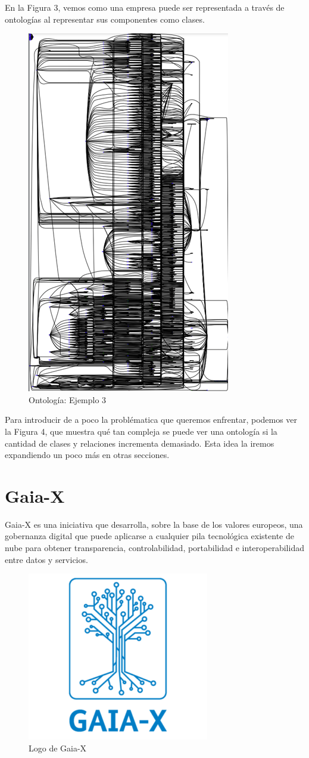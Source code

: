 En la Figura 3, vemos como una empresa puede ser representada a través de ontologías al representar sus componentes como clases.

\begin{figure}[ht]
   \begin{center}
      \includegraphics[width=0.4\linewidth]{introduction/figures/ontology_example_3.jpg}
   \end{center}
   \caption[Ontología: Ejemplo 3]
   {\footnotesize Ontología: Ejemplo 3}
   \label{fig:mufigure7}
\end{figure}

Para introducir de a poco la problématica que queremos enfrentar, podemos ver la Figura 4, que muestra qué tan compleja se puede ver una ontología si la cantidad de clases y relaciones incrementa demasiado.
Esta idea la iremos expandiendo un poco más en otras secciones.

\section{Gaia-X}

Gaia-X es una iniciativa que desarrolla, sobre la base de los valores europeos, una gobernanza digital que puede aplicarse a cualquier pila tecnológica existente de nube para obtener transparencia, controlabilidad, portabilidad e interoperabilidad entre datos y servicios. \cite[]{Gaiax}

\begin{figure}[ht]
   \begin{center}
      \includegraphics[width=0.4\linewidth]{introduction/figures/gaia-x.png}
   \end{center}
   \caption[Logo de Gaia-X]
   {\footnotesize Logo de Gaia-X}
   \label{fig:mufigure7}
\end{figure}

